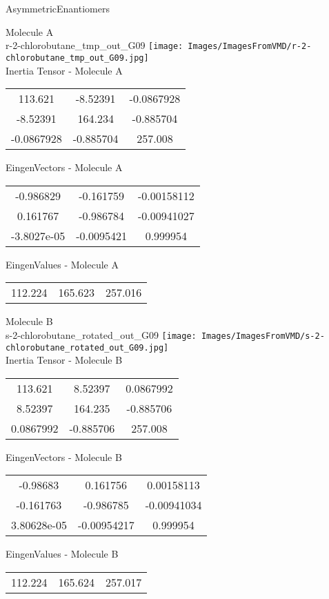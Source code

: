 \vtab[-2cm]
\begin{center}
{\large AsymmetricEnantiomers}
\end{center}
\begin{multicols}{2}
\begin{center}
Molecule A \\ 
r-2-chlorobutane\_tmp\_out\_G09
\texttt{[image: Images/ImagesFromVMD/r-2-chlorobutane\_tmp\_out\_G09.jpg]}
\\
Inertia Tensor - Molecule A \\
\vtab
\begin{tabular}{|c c c|}
113.621	 & 	-8.52391	 & 	-0.0867928	 \\
-8.52391	 & 	164.234	 & 	-0.885704	 \\
-0.0867928	 & 	-0.885704	 & 	257.008
\end{tabular}

\vtab
 EingenVectors - Molecule A     \\
\vtab
\begin{tabular}{|c c c|}
-0.986829	 & 	-0.161759	 & 	-0.00158112	 \\
0.161767	 & 	-0.986784	 & 	-0.00941027	 \\
-3.8027e-05	 & 	-0.0095421	 & 	0.999954
\end{tabular}

\vtab
 EingenValues - Molecule A     \\
\vtab
\begin{tabular}{|c c c|}
112.224	 & 	165.623	 & 	257.016
\end{tabular}
\columnbreak

Molecule B \\ 
s-2-chlorobutane\_rotated\_out\_G09
\texttt{[image: Images/ImagesFromVMD/s-2-chlorobutane\_rotated\_out\_G09.jpg]}
\\
Inertia Tensor - Molecule B \\
\vtab
\begin{tabular}{|c c c|}
113.621	 & 	8.52397	 & 	0.0867992	 \\
8.52397	 & 	164.235	 & 	-0.885706	 \\
0.0867992	 & 	-0.885706	 & 	257.008
\end{tabular}

\vtab
 EingenVectors - Molecule B     \\
\vtab
\begin{tabular}{|c c c|}
-0.98683	 & 	0.161756	 & 	0.00158113	 \\
-0.161763	 & 	-0.986785	 & 	-0.00941034	 \\
3.80628e-05	 & 	-0.00954217	 & 	0.999954
\end{tabular}

\vtab
 EingenValues - Molecule B     \\
\vtab
\begin{tabular}{|c c c|}
112.224	 & 	165.624	 & 	257.017
\end{tabular}

\end{center}
\end{multicols}
